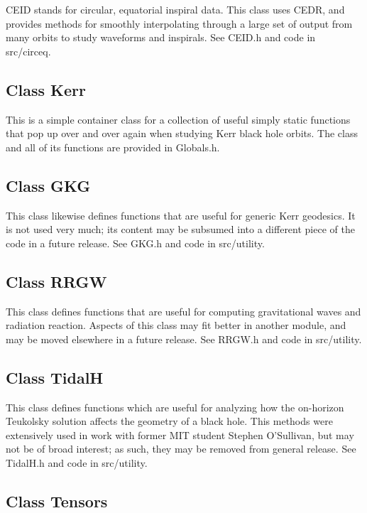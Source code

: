 \documentclass[11pt]{article}
\begin{document}
CEID stands for circular, equatorial inspiral data.  This class uses CEDR, and provides methods for smoothly interpolating through a large set of output from many orbits to study waveforms and inspirals.  See CEID.h and code in src/circeq.

 \subsection{Class Kerr}
 
 This is a simple container class for a collection of useful simply static functions that pop up over and over again when studying Kerr black hole orbits.  The class and all of its functions are provided in Globals.h.
 
 \subsection{Class GKG}
 
 This class likewise defines functions that are useful for generic Kerr geodesics.  It is not used very much; its content may be subsumed into a different piece of the code in a future release.  See GKG.h and code in src/utility.
 
 \subsection{Class RRGW}
 
 This class defines functions that are useful for computing gravitational waves and radiation reaction.  Aspects of this class may fit better in another module, and may be moved elsewhere in a future release.  See RRGW.h and code in src/utility.
 
 \subsection{Class TidalH}
 
 This class defines functions which are useful for analyzing how the on-horizon Teukolsky solution affects the geometry of a black hole.  This methods were extensively used in work with former MIT student Stephen O'Sullivan, but may not be of broad interest; as such, they may be removed from general release.  See TidalH.h and code in src/utility.
 
 \subsection{Class Tensors}
 
\end{document}
